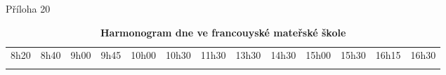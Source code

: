 \begin{landscape}
\begin{table}
Příloha 20\\
	\shorthandoff{-}
	\begin{tabular}{
	|p{10mm}
	|p{10mm}
	|p{23mm}
	|p{8mm}
	|p{15mm}
	|p{27mm}
	|p{18mm} %
	|p{30mm}
	|p{15mm}
	|p{15mm}
	|p{23mm}
	|p{7mm}
	|p{0mm}}
		\multicolumn{1}{l}{\hspace{-5mm}8h20} & 
		\multicolumn{1}{l}{\hspace{-5mm}8h40} &  	%
		\multicolumn{1}{l}{\hspace{-5mm}9h00} &  	%
		\multicolumn{1}{l}{\hspace{-5mm}9h45} & 	%
		\multicolumn{1}{l}{\hspace{-8mm}10h00} & 	%
		\multicolumn{1}{l}{\hspace{-8mm}10h30} &  	%
		\multicolumn{1}{l}{\hspace{-8mm}11h30} &  	%
		\multicolumn{1}{l}{\hspace{-8mm}13h30} &  	%
		\multicolumn{1}{l}{\hspace{-8mm}14h30} &  	%
		\multicolumn{1}{l}{\hspace{-8mm}15h00} & 	%
		\multicolumn{1}{l}{\hspace{-8mm}15h30} &  	%
		\multicolumn{1}{l}{\hspace{-8mm}16h15} &  	%
		\multicolumn{1}{l}{\hspace{-8mm}16h30}  \\ 	%
		\cline{1-6}\cline{8-12}
		 & & & & \cellcolor{gray!50} & & & & &  \cellcolor{gray!50}& & &
		 \multicolumn{1}{l}{} \\ [15mm]
		 \cline{1-6}\cline{8-12}
	\end{tabular}
	\hfill
	\caption{\textbf{Harmonogram dne ve francouyské mateřské škole}}
	\label{tabulkaMS}
\end{table}


\end{landscape}
